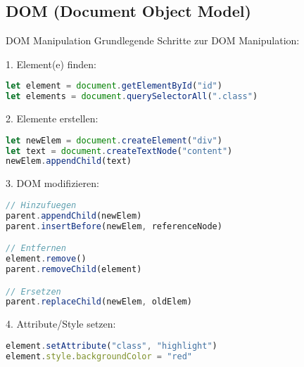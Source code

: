 \subsection{DOM (Document Object Model)}

\begin{KR}{DOM Manipulation}
Grundlegende Schritte zur DOM Manipulation:

1. Element(e) finden:
\begin{lstlisting}[language=JavaScript, style=basesmol]
let element = document.getElementById("id")
let elements = document.querySelectorAll(".class")
\end{lstlisting}

2. Elemente erstellen:
\begin{lstlisting}[language=JavaScript, style=basesmol]
let newElem = document.createElement("div")
let text = document.createTextNode("content")
newElem.appendChild(text)
\end{lstlisting}

3. DOM modifizieren:
\begin{lstlisting}[language=JavaScript, style=basesmol]
// Hinzufuegen
parent.appendChild(newElem)
parent.insertBefore(newElem, referenceNode)

// Entfernen
element.remove()
parent.removeChild(element)

// Ersetzen
parent.replaceChild(newElem, oldElem)
\end{lstlisting}

4. Attribute/Style setzen:
\begin{lstlisting}[language=JavaScript, style=basesmol]
element.setAttribute("class", "highlight")
element.style.backgroundColor = "red"
\end{lstlisting}
\end{KR}